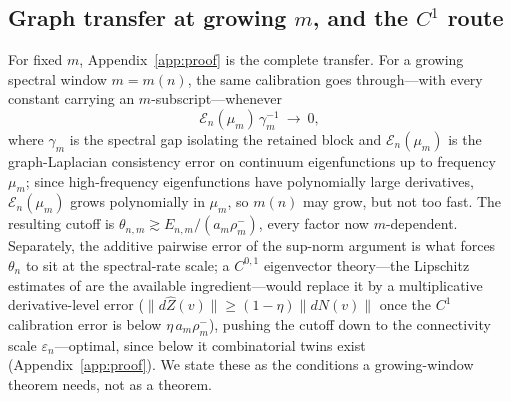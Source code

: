 \documentclass[review,supplement]{siamart220329}
\begin{document}
\subsection*{Graph transfer at growing $m$, and the $C^1$ route}
For fixed $m$, Appendix~\ref{app:proof} is the complete transfer. For a
growing spectral window $m=m(n)$, the same calibration goes through---with
every constant carrying an $m$-subscript---whenever
\[
\mathcal E_n(\mu_m)\,\gamma_m^{-1}\ \longrightarrow\ 0,
\]
where $\gamma_m$ is the spectral gap isolating the retained block and
$\mathcal E_n(\mu_m)$ is the graph-Laplacian consistency error on continuum
eigenfunctions up to frequency $\mu_m$; since high-frequency eigenfunctions
have polynomially large derivatives, $\mathcal E_n(\mu_m)$ grows polynomially
in $\mu_m$, so $m(n)$ may grow, but not too fast. The resulting cutoff is
$\theta_{n,m}\gtrsim E_{n,m}/(a_m\rho^-_m)$, every factor now
$m$-dependent. Separately, the additive pairwise error of the sup-norm
argument is what forces $\theta_n$ to sit at the spectral-rate scale; a
$C^{0,1}$ eigenvector theory---the Lipschitz estimates of
\cite{calderlewicka2022} are the available ingredient---would replace it by a
multiplicative derivative-level error ($\lVert d\hat Z(v)\rVert\ge
(1-\eta)\lVert dN(v)\rVert$ once the $C^1$ calibration error is below
$\eta\,a_m\rho^-_m$), pushing the cutoff down to the connectivity scale
$\varepsilon_n$---optimal, since below it combinatorial twins exist
(Appendix~\ref{app:proof}). We state these as the conditions a growing-window
theorem needs, not as a theorem.
\end{document}
